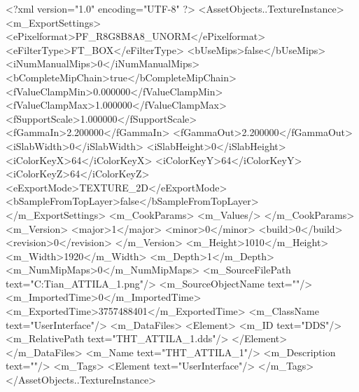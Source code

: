 <?xml version="1.0" encoding="UTF-8" ?>
<AssetObjects..TextureInstance>
	<m_ExportSettings>
		<ePixelformat>PF_R8G8B8A8_UNORM</ePixelformat>
		<eFilterType>FT_BOX</eFilterType>
		<bUseMips>false</bUseMips>
		<iNumManualMips>0</iNumManualMips>
		<bCompleteMipChain>true</bCompleteMipChain>
		<fValueClampMin>0.000000</fValueClampMin>
		<fValueClampMax>1.000000</fValueClampMax>
		<fSupportScale>1.000000</fSupportScale>
		<fGammaIn>2.200000</fGammaIn>
		<fGammaOut>2.200000</fGammaOut>
		<iSlabWidth>0</iSlabWidth>
		<iSlabHeight>0</iSlabHeight>
		<iColorKeyX>64</iColorKeyX>
		<iColorKeyY>64</iColorKeyY>
		<iColorKeyZ>64</iColorKeyZ>
		<eExportMode>TEXTURE_2D</eExportMode>
		<bSampleFromTopLayer>false</bSampleFromTopLayer>
	</m_ExportSettings>
	<m_CookParams>
		<m_Values/>
	</m_CookParams>
	<m_Version>
		<major>1</major>
		<minor>0</minor>
		<build>0</build>
		<revision>0</revision>
	</m_Version>
	<m_Height>1010</m_Height>
	<m_Width>1920</m_Width>
	<m_Depth>1</m_Depth>
	<m_NumMipMaps>0</m_NumMipMaps>
	<m_SourceFilePath text="C:\Users\Troy Tian\Downloads\THT_ATTILA_1.png"/>
	<m_SourceObjectName text=""/>
	<m_ImportedTime>0</m_ImportedTime>
	<m_ExportedTime>3757488401</m_ExportedTime>
	<m_ClassName text="UserInterface"/>
	<m_DataFiles>
		<Element>
			<m_ID text="DDS"/>
			<m_RelativePath text="THT_ATTILA_1.dds"/>
		</Element>
	</m_DataFiles>
	<m_Name text="THT_ATTILA_1"/>
	<m_Description text=""/>
	<m_Tags>
		<Element text="UserInterface"/>
	</m_Tags>
</AssetObjects..TextureInstance>

